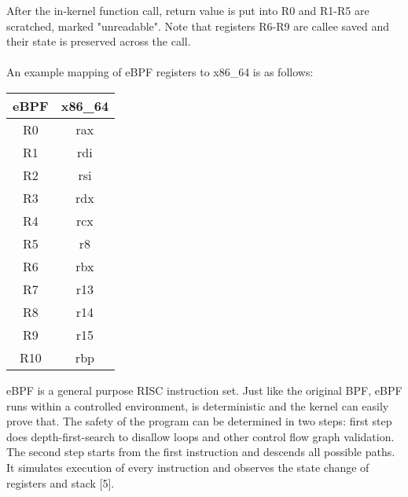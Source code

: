 \documentclass{l4proj}
\begin{document}
After the in-kernel function call, return value is put into R0 and R1-R5 are scratched, marked "unreadable". Note that registers R6-R9 are callee saved and their state is preserved across the call.\\\\
An example mapping of eBPF registers to x86\_64 is as follows:
\begin{center}
\begin{tabular}{ |c|c| } 
 \hline
 eBPF & x86\_64 \\ 
  \hline
   R0 & rax \\
   R1 & rdi \\
   R2 & rsi \\
   R3 & rdx \\
   R4 & rcx \\
   R5 & r8 \\
   R6 & rbx \\
   R7 & r13 \\
   R8 & r14 \\
   R9 & r15 \\
   R10 & rbp \\
 \hline
\end{tabular}
\end{center}
eBPF is a general purpose RISC instruction set. Just like the original BPF, eBPF runs within a controlled environment, is deterministic and the kernel can easily prove that. The safety of the program can be determined in two steps: first step does depth-first-search to disallow loops and other control flow graph validation. The second step starts from the first instruction and descends all possible paths. It simulates execution of every instruction and observes the state change of registers and stack [5].
\end{document}
